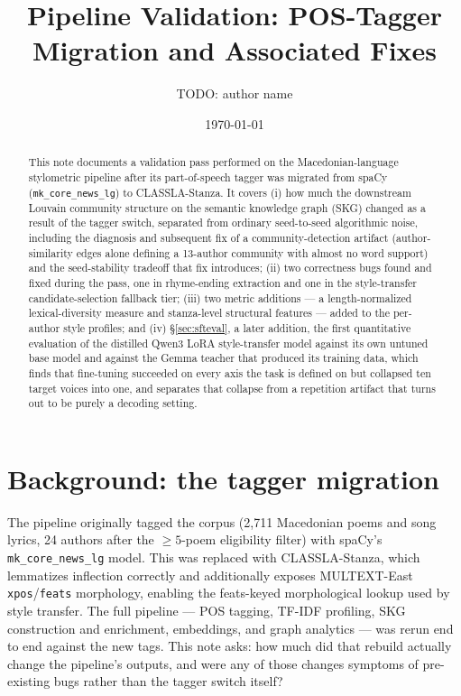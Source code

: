 \documentclass[11pt]{article}
\title{Pipeline Validation: POS-Tagger Migration and Associated Fixes}
\author{TODO: author name}
\date{\today}
\begin{document}
\maketitle

\begin{abstract}
This note documents a validation pass performed on the Macedonian-language
stylometric pipeline after its part-of-speech tagger was migrated from spaCy
(\texttt{mk\_core\_news\_lg}) to CLASSLA-Stanza. It covers (i) how much the
downstream Louvain community structure on the semantic knowledge graph (SKG)
changed as a result of the tagger switch, separated from ordinary
seed-to-seed algorithmic noise, including the diagnosis and subsequent fix
of a community-detection artifact (author-similarity edges alone defining a
13-author community with almost no word support) and the seed-stability
tradeoff that fix introduces; (ii) two correctness bugs found and fixed
during the pass, one in rhyme-ending extraction and one in the style-transfer
candidate-selection fallback tier; (iii) two metric additions — a
length-normalized lexical-diversity measure and stanza-level structural
features — added to the per-author style profiles; and
(iv) \S\ref{sec:sfteval}, a later addition, the first quantitative evaluation
of the distilled Qwen3 LoRA style-transfer model against its own untuned base
model and against the Gemma teacher that produced its training data, which
finds that fine-tuning succeeded on every axis the task is defined on but
collapsed ten target voices into one, and separates that collapse from a
repetition artifact that turns out to be purely a decoding setting.
\end{abstract}

\section{Background: the tagger migration}

The pipeline originally tagged the corpus (2{,}711 Macedonian poems and song
lyrics, 24 authors after the $\geq 5$-poem eligibility filter) with spaCy's
\texttt{mk\_core\_news\_lg} model. This was replaced with CLASSLA-Stanza,
which lemmatizes inflection correctly and additionally exposes MULTEXT-East
\texttt{xpos}/\texttt{feats} morphology, enabling the feats-keyed
morphological lookup used by style transfer. The full pipeline — POS
tagging, TF-IDF profiling, SKG construction and enrichment, embeddings, and
graph analytics — was rerun end to end against the new tags. This note asks:
how much did that rebuild actually change the pipeline's outputs, and were
any of those changes symptoms of pre-existing bugs rather than the tagger
switch itself?
\end{document}
